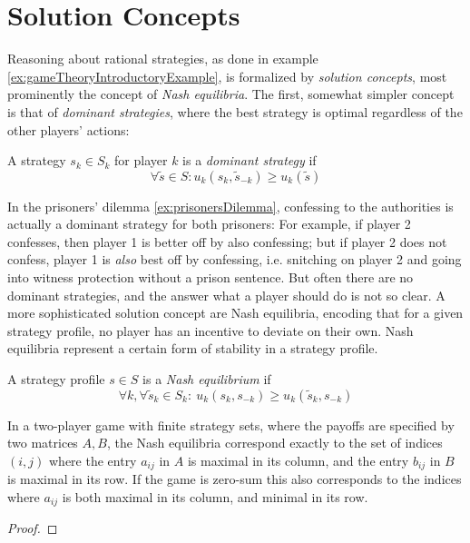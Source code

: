 \documentclass[a4paper]{scrreprt}
\begin{document}
    \section{Solution Concepts}
    Reasoning about rational strategies, as done in example \ref{ex:gameTheoryIntroductoryExample}, is formalized by \emph{solution concepts}, most prominently the concept of \emph{Nash equilibria}. The first, somewhat simpler concept is that of \emph{dominant strategies}, where the best strategy is optimal regardless of the other players' actions:
    
    \begin{defn}
        A strategy $s_k \in S_k$ for player $k$ is a \emph{dominant strategy} if 
        \[ \forall \tilde{s} \in S: u_k(s_k, \tilde{s}_{-k}) \geq u_k(\tilde{s}) \]
    \end{defn}
    
    In the prisoners' dilemma \ref{ex:prisonersDilemma}, confessing to the authorities is actually a dominant strategy for both prisoners:
    For example, if player 2 confesses, then player 1 is better off by also confessing; but if player 2 does not confess, player 1 is \emph{also} best off by confessing, i.e. snitching on player 2 and going into witness protection without a prison sentence.
    But often there are no dominant strategies, and the answer what a player should do is not so clear.
    A more sophisticated solution concept are Nash equilibria, encoding that for a given strategy profile, no player has an incentive to deviate on their own. Nash equilibria represent a certain form of stability in a strategy profile.
    
    \begin{defn}
        A strategy profile $s \in S$ is a \emph{Nash equilibrium} if
        \[
            \forall k, \forall \tilde{s}_k \in S_k:~ u_k(s_k, s_{-k}) \geq u_k(\tilde{s}_k, s_{-k})
        \]
        \label{def:nashEquilibriumRealValued}
    \end{defn}
    
    \begin{lemma} 
        In a two-player game with finite strategy sets, where the payoffs are specified by two matrices $A, B$, the Nash equilibria correspond
        exactly to the set of indices $(i, j)$ where the entry $a_{ij}$ in $A$ is maximal in its column, and the entry $b_{ij}$ in $B$ is maximal in its row.
        If the game is zero-sum this also corresponds to the indices where $a_{ij}$ is both maximal in its column, and minimal in its row.
    \end{lemma}
    \begin{proof}
    \end{proof}
\end{document}
